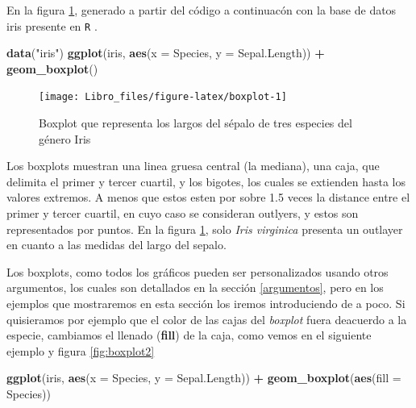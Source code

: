 \documentclass[]{book}
\newenvironment{Shaded}{\begin{snugshade}}{\end{snugshade}}
\newcommand{\DataTypeTok}[1]{\textcolor[rgb]{0.13,0.29,0.53}{#1}}
\newcommand{\KeywordTok}[1]{\textcolor[rgb]{0.13,0.29,0.53}{\textbf{#1}}}
\newcommand{\NormalTok}[1]{#1}
\newcommand{\OperatorTok}[1]{\textcolor[rgb]{0.81,0.36,0.00}{\textbf{#1}}}
\newcommand{\StringTok}[1]{\textcolor[rgb]{0.31,0.60,0.02}{#1}}
\begin{document}
En la figura \ref{fig:boxplot}, generado a partir del código a
continuacón con la base de datos iris presente en \texttt{R}
\citep{anderson1935irises}.

\begin{Shaded}
\begin{Highlighting}[]
\KeywordTok{data}\NormalTok{(}\StringTok{"iris"}\NormalTok{)}
\KeywordTok{ggplot}\NormalTok{(iris, }\KeywordTok{aes}\NormalTok{(}\DataTypeTok{x =}\NormalTok{ Species, }\DataTypeTok{y =}\NormalTok{ Sepal.Length)) }\OperatorTok{+}\StringTok{ }\KeywordTok{geom_boxplot}\NormalTok{()}
\end{Highlighting}
\end{Shaded}

\begin{figure}

{\centering \texttt{[image: Libro\_files/figure-latex/boxplot-1]} 

}

\caption{Boxplot que representa los largos del sépalo de tres especies del género Iris}\label{fig:boxplot}
\end{figure}

Los boxplots muestran una linea gruesa central (la mediana), una caja,
que delimita el primer y tercer cuartil, y los bigotes, los cuales se
extienden hasta los valores extremos. A menos que estos esten por sobre
1.5 veces la distance entre el primer y tercer cuartil, en cuyo caso se
consideran outlyers, y estos son representados por puntos. En la figura
\ref{fig:boxplot}, solo \emph{Iris virginica} presenta un outlayer en
cuanto a las medidas del largo del sepalo.

Los boxplots, como todos los gráficos pueden ser personalizados usando
otros argumentos, los cuales son detallados en la sección
\ref{argumentos}, pero en los ejemplos que mostraremos en esta sección
los iremos introduciendo de a poco. Si quisieramos por ejemplo que el
color de las cajas del \emph{boxplot} fuera deacuerdo a la especie,
cambiamos el llenado (\textbf{fill}) de la caja, como vemos en el
siguiente ejemplo y figura \ref{fig:boxplot2}

\begin{Shaded}
\begin{Highlighting}[]
\KeywordTok{ggplot}\NormalTok{(iris, }\KeywordTok{aes}\NormalTok{(}\DataTypeTok{x =}\NormalTok{ Species, }\DataTypeTok{y =}\NormalTok{ Sepal.Length)) }\OperatorTok{+}\StringTok{ }\KeywordTok{geom_boxplot}\NormalTok{(}\KeywordTok{aes}\NormalTok{(}\DataTypeTok{fill =}\NormalTok{ Species))}
\end{Highlighting}
\end{Shaded}
\end{document}
